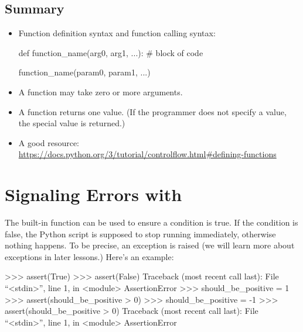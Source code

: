 \documentclass[11pt]{cselabheader}
\begin{document}
\subsection{Summary}
\label{subsec:funcs.sum}

\begin{itemize}
  \item Function definition syntax and function calling syntax:

    \begin{multicols}{2}
    \begin{python3code}
def function_name(arg0, arg1, ...):
    # block of code
    \end{python3code}

    \begin{python3code}
function_name(param0, param1, ...)
    \end{python3code}
    \end{multicols}

  \item A function may take zero or more arguments.

  \item A function returns one value. (If the programmer does not specify a
    value, the special value  is returned.)

  \item A good resource: \url{https://docs.python.org/3/tutorial/controlflow.html#defining-functions}
\end{itemize}

\pagebreak
\section{Signaling Errors with \protect{}}
The built-in function  can be used to ensure a
condition is true.
If the condition is false, the Python script is supposed to stop running
immediately, otherwise nothing happens.
To be precise, an  exception is raised
(we will learn more about exceptions in later lessons.)
Here's an example:
\begin{pyconcode}
>>> assert(True)
>>> assert(False)
Traceback (most recent call last):
  File ``<stdin>'', line 1, in <module>
AssertionError
>>> should_be_positive = 1
>>> assert(should_be_positive > 0)
>>> should_be_positive = -1
>>> assert(should_be_positive > 0)
Traceback (most recent call last):
  File ``<stdin>'', line 1, in <module>
AssertionError
\end{pyconcode}
\end{document}
